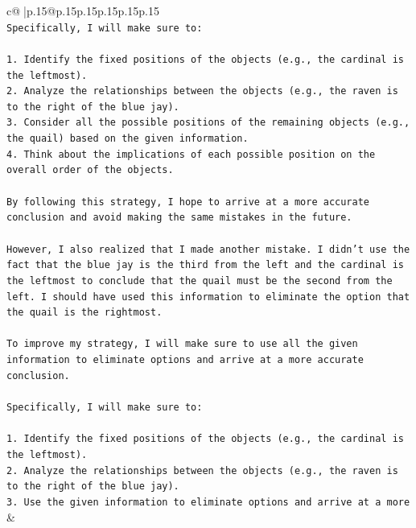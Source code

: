 \documentclass{article}
\begin{document}
{\begin{supertabular}{c@{$\;$}|p{.15\linewidth}@{}p{.15\linewidth}p{.15\linewidth}p{.15\linewidth}p{.15\linewidth}p{.15\linewidth}}
{{{\\ 
\texttt{Specifically, I will make sure to:} \\
\\ 
\texttt{1. Identify the fixed positions of the objects (e.g., the cardinal is the leftmost).} \\
\texttt{2. Analyze the relationships between the objects (e.g., the raven is to the right of the blue jay).} \\
\texttt{3. Consider all the possible positions of the remaining objects (e.g., the quail) based on the given information.} \\
\texttt{4. Think about the implications of each possible position on the overall order of the objects.} \\
\\ 
\texttt{By following this strategy, I hope to arrive at a more accurate conclusion and avoid making the same mistakes in the future.} \\
\\ 
\texttt{However, I also realized that I made another mistake. I didn't use the fact that the blue jay is the third from the left and the cardinal is the leftmost to conclude that the quail must be the second from the left. I should have used this information to eliminate the option that the quail is the rightmost.} \\
\\ 
\texttt{To improve my strategy, I will make sure to use all the given information to eliminate options and arrive at a more accurate conclusion. } \\
\\ 
\texttt{Specifically, I will make sure to:} \\
\\ 
\texttt{1. Identify the fixed positions of the objects (e.g., the cardinal is the leftmost).} \\
\texttt{2. Analyze the relationships between the objects (e.g., the raven is to the right of the blue jay).} \\
\texttt{3. Use the given information to eliminate options and arrive at a more} \\
            }
        }
    }
    & \\ \\

\end{supertabular}
}
\end{document}
